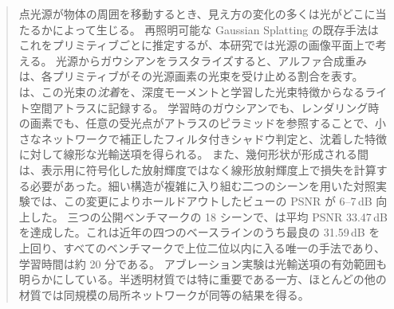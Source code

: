 \begin{abstract}
点光源が物体の周囲を移動するとき、見え方の変化の多くは光がどこに当たるかによって生じる。
再照明可能な Gaussian Splatting の既存手法はこれをプリミティブごとに推定するが、本研究では光源の画像平面上で考える。
光源からガウシアンをラスタライズすると、アルファ合成重みは、各プリミティブがその光源画素の光束を受け止める割合を表す。
\ours は、この光束の\emph{沈着}を、深度モーメントと学習した光束特徴からなるライト空間アトラスに記録する。
学習時のガウシアンでも、レンダリング時の画素でも、任意の受光点がアトラスのピラミッドを参照することで、小さなネットワークで補正したフィルタ付きシャドウ判定と、沈着した特徴に対して線形な光輸送項を得られる。
また、幾何形状が形成される間は、表示用に符号化した放射輝度ではなく線形放射輝度上で損失を計算する必要があった。細い構造が複雑に入り組む二つのシーンを用いた対照実験では、この変更によりホールドアウトしたビューの PSNR が 6--7\,dB 向上した。
三つの公開ベンチマークの 18 シーンで、\ours は平均 PSNR 33.47\,dB を達成した。これは近年の四つのベースラインのうち最良の 31.59\,dB を上回り、すべてのベンチマークで上位二位以内に入る唯一の手法であり、学習時間は約 20 分である。
アブレーション実験は光輸送項の有効範囲も明らかにしている。半透明材質では特に重要である一方、ほとんどの他の材質では同規模の局所ネットワークが同等の結果を得る。
\end{abstract}
